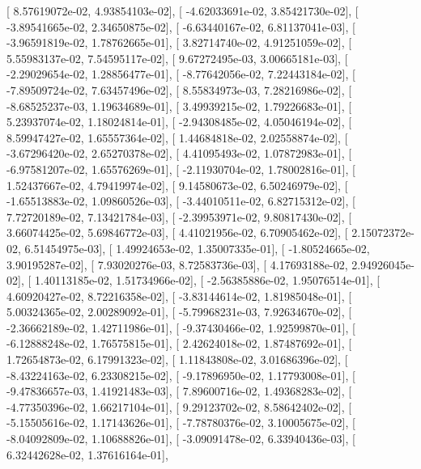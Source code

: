 \documentclass{article}
\begin{document}
       [  8.57619072e-02,   4.93854103e-02],
       [ -4.62033691e-02,   3.85421730e-02],
       [ -3.89541665e-02,   2.34650875e-02],
       [ -6.63440167e-02,   6.81137041e-03],
       [ -3.96591819e-02,   1.78762665e-01],
       [  3.82714740e-02,   4.91251059e-02],
       [  5.55983137e-02,   7.54595117e-02],
       [  9.67272495e-03,   3.00665181e-03],
       [ -2.29029654e-02,   1.28856477e-01],
       [ -8.77642056e-02,   7.22443184e-02],
       [ -7.89509724e-02,   7.63457496e-02],
       [  8.55834973e-03,   7.28216986e-02],
       [ -8.68525237e-03,   1.19634689e-01],
       [  3.49939215e-02,   1.79226683e-01],
       [  5.23937074e-02,   1.18024814e-01],
       [ -2.94308485e-02,   4.05046194e-02],
       [  8.59947427e-02,   1.65557364e-02],
       [  1.44684818e-02,   2.02558874e-02],
       [ -3.67296420e-02,   2.65270378e-02],
       [  4.41095493e-02,   1.07872983e-01],
       [ -6.97581207e-02,   1.65576269e-01],
       [ -2.11930704e-02,   1.78002816e-01],
       [  1.52437667e-02,   4.79419974e-02],
       [  9.14580673e-02,   6.50246979e-02],
       [ -1.65513883e-02,   1.09860526e-03],
       [ -3.44010511e-02,   6.82715312e-02],
       [  7.72720189e-02,   7.13421784e-03],
       [ -2.39953971e-02,   9.80817430e-02],
       [  3.66074425e-02,   5.69846772e-03],
       [  4.41021956e-02,   6.70905462e-02],
       [  2.15072372e-02,   6.51454975e-03],
       [  1.49924653e-02,   1.35007335e-01],
       [ -1.80524665e-02,   3.90195287e-02],
       [  7.93020276e-03,   8.72583736e-03],
       [  4.17693188e-02,   2.94926045e-02],
       [  1.40113185e-02,   1.51734966e-02],
       [ -2.56385886e-02,   1.95076514e-01],
       [  4.60920427e-02,   8.72216358e-02],
       [ -3.83144614e-02,   1.81985048e-01],
       [  5.00324365e-02,   2.00289092e-01],
       [ -5.79968231e-03,   7.92634670e-02],
       [ -2.36662189e-02,   1.42711986e-01],
       [ -9.37430466e-02,   1.92599870e-01],
       [ -6.12888248e-02,   1.76575815e-01],
       [  2.42624018e-02,   1.87487692e-01],
       [  1.72654873e-02,   6.17991323e-02],
       [  1.11843808e-02,   3.01686396e-02],
       [ -8.43224163e-02,   6.23308215e-02],
       [ -9.17896950e-02,   1.17793008e-01],
       [ -9.47836657e-03,   1.41921483e-03],
       [  7.89600716e-02,   1.49368283e-02],
       [ -4.77350396e-02,   1.66217104e-01],
       [  9.29123702e-02,   8.58642402e-02],
       [ -5.15505616e-02,   1.17143626e-01],
       [ -7.78780376e-02,   3.10005675e-02],
       [ -8.04092809e-02,   1.10688826e-01],
       [ -3.09091478e-02,   6.33940436e-03],
       [  6.32442628e-02,   1.37616164e-01],
\end{document}
